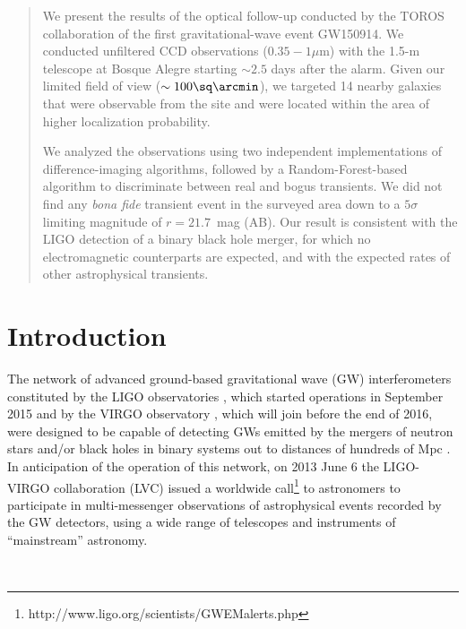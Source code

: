 \documentclass[apjl]{emulateapj}
\begin{document}
\begin{abstract}
We present the results of the optical follow-up conducted by the TOROS collaboration of the first gravitational-wave event GW150914. We conducted unfiltered CCD observations ($0.35-1\mu$m) with the 1.5-m telescope at Bosque Alegre starting $\sim2.5$ days after the alarm. Given our limited field of view ($\sim100\sq\arcmin$), we targeted 14 nearby galaxies that were observable from the site and were located within the area of higher localization probability.

We analyzed the observations using two independent implementations of difference-imaging algorithms, followed by a Random-Forest-based algorithm to discriminate between real and bogus transients. We did not find any {\it bona fide} transient event in the surveyed area down to a $5\sigma$ limiting magnitude of $r=21.7$~mag (AB). Our result is consistent with the LIGO detection of a binary black hole merger, for which no electromagnetic counterparts are expected, and with the expected rates of other astrophysical transients.
\end{abstract}


\section{Introduction}
\setcounter{footnote}{10}
The network of advanced ground-based gravitational wave (GW) interferometers constituted by the LIGO observatories \citep{LSC2015}, which started operations in September 2015 and by the VIRGO observatory \citep{Acernese2015}, which will join before the end of 2016, were designed to be capable of detecting GWs emitted by the mergers of neutron stars and/or black holes in binary systems out to distances of hundreds of Mpc \citep[see][and references therein]{Abbott2016b}. In anticipation of the operation of this network, on 2013 June 6 the LIGO-VIRGO collaboration (LVC) issued a worldwide call\footnote{http://www.ligo.org/scientists/GWEMalerts.php} to astronomers to participate in multi-messenger observations of astrophysical events recorded by the GW detectors, using a wide range of telescopes and instruments of ``mainstream'' astronomy.

\ \par
\end{document}
